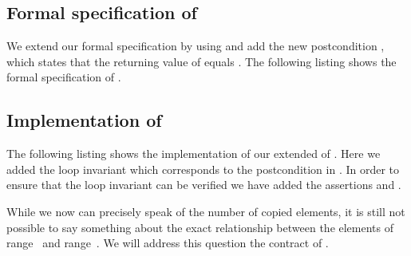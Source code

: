 \FloatBarrier


\subsection{Formal specification of \removecopyii}

We extend our formal specification by using 
and add the new postcondition , which states that the returning value
of \removecopyii equals \CountNotEqual.
The following listing shows the formal specification of .



\subsection{Implementation of \removecopyii}

The following listing shows the implementation of our
extended of \removecopyii.
Here we added the loop invariant  which corresponds to the 
postcondition in .
In order to ensure that the loop invariant  can be verified
we have added the assertions  and .



While we now can precisely speak of the number of copied elements,
it is still not possible to say something about the exact relationship between
the elements of range~ and range~.
We will address this question the contract of .

\clearpage

